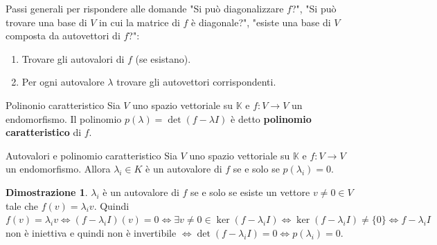 \documentclass[a4paper]{article}
\theoremstyle{definition}
\newtheorem*{dimm}{Dimostrazione}
\begin{document}
	Passi generali per rispondere alle domande "Si può diagonalizzare $f$?",
	"Si può trovare una base di $V$ in cui la matrice di $f$ è diagonale?",
	"esiste una base di $V$ composta da autovettori di $f$?":
	\begin{enumerate}
		\item Trovare gli autovalori di $f$ (se esistano).
		\item Per ogni autovalore $\lambda$ trovare gli autovettori corrispondenti.
	\end{enumerate}

	\begin{deff}{Polinonio caratteristico}{}
		Sia $V$ uno spazio vettoriale su $\mathbb{K}$ e $f: V \to V$ un endomorfismo.
		Il polinomio $p(\lambda) = \det(f - \lambda I)$ è detto \textbf{polinomio caratteristico} di $f$.
	\end{deff}
	\begin{teo}{Autovalori e polinomio caratteristico}{}
		Sia $V$ uno spazio vettoriale su $\mathbb{K}$ e $f: V \to V$ un endomorfismo.
		Allora $\lambda_i \in K$ è un autovalore di $f$ se e solo se $p(\lambda_i) = 0$.
	\end{teo}
	\begin{dimm}
		$\lambda_i$ è un autovalore di $f$ se e solo se esiste un vettore $v \ne 0 \in V$ tale che $f(v) = \lambda_i v$.
		Quindi $f(v) = \lambda_i v \Leftrightarrow (f - \lambda_i I)(v) = 0 \Leftrightarrow \exists v \ne 0 \in \ker (f - \lambda_i I)
		\Leftrightarrow \ker (f - \lambda_i I) \ne \{0\} \Leftrightarrow f - \lambda_i I$ non è iniettiva e quindi non è invertibile
		$\Leftrightarrow \det(f - \lambda_i I) = 0 \Leftrightarrow p(\lambda_i) = 0$. 
	\end{dimm}
\end{document}
